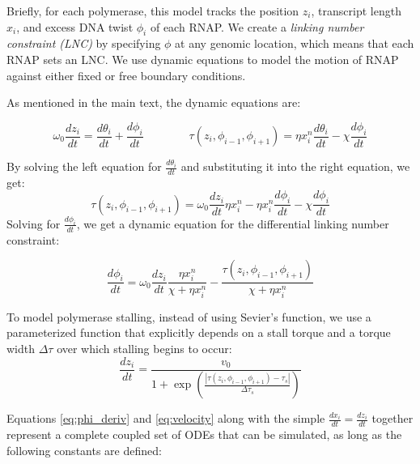 \documentclass[11pt]{article}
\begin{document}
Briefly, for each polymerase, this model tracks the position \(z_i\), transcript length \(x_i\), and excess DNA twist \(\phi_i\) of each RNAP. We create a \emph{linking number constraint (LNC)} by specifying \(\phi\) at any genomic location, which means that each RNAP sets an LNC. We use dynamic equations to model the motion of RNAP against either fixed or free boundary conditions.

As mentioned in the main text, the dynamic equations are:

\begin{equation}
    \omega_0 \frac{d z_i}{dt} = \frac{d \theta_i}{dt} + \frac{d \phi_i}{dt} \qquad \qquad \tau(z_i, \phi_{i-1}, \phi_{i+1}) = \eta x_i^n \frac{d\theta_i}{dt} - \chi \frac{d\phi_i}{dt}
\end{equation}

By solving the left equation for \(\frac{d \theta_i}{dt}\) and substituting it into the right equation, we get:
\[\tau(z_i, \phi_{i-1}, \phi_{i+1}) = \omega_0 \frac{dz_i}{dt} \eta x_i^n - \eta x_i^n \frac{d\phi_i}{dt} - \chi \frac{d\phi_i}{dt}\]
Solving for \(\frac{d\phi_i}{dt}\), we get a dynamic equation for the differential linking number constraint:

\begin{equation}
    \frac{d\phi_i}{dt} = \omega_0 \frac{dz_i}{dt} \frac{\eta x_i^n}{\chi + \eta x_i^n} - \frac{\tau(z_i, \phi_{i-1}, \phi_{i+1})}{\chi + \eta x_i^n}
\end{equation} \label{eq:phi_deriv}

To model polymerase stalling, instead of using Sevier's function, we use a parameterized function that explicitly depends on a stall torque and a torque width \(\Delta \tau\) over which stalling begins to occur:
\begin{equation}
    \frac{dz_i}{dt} = \frac{v_0}{1 + \exp\left(\frac{|\tau(z_i, \phi_{i-1}, \phi_{i+1}) - \tau_s|}{\Delta \tau_s}\right)}
\end{equation} \label{eq:velocity}

Equations \ref{eq:phi_deriv} and \ref{eq:velocity} along with the simple \(\frac{dx_i}{dt} = \frac{dz_i}{dt}\) together represent a complete coupled set of ODEs that can be simulated, as long as the following constants are defined:
\end{document}
